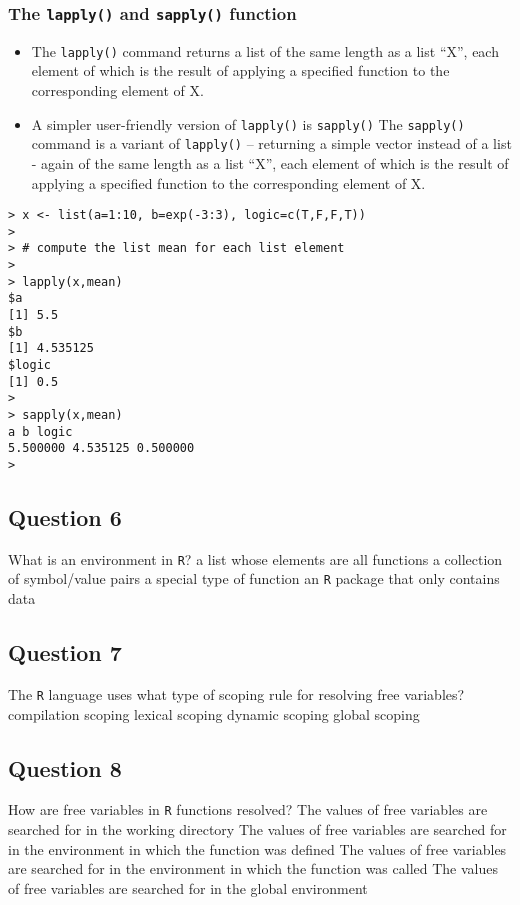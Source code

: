 \documentclass[12pt]{article}
\begin{document}
\subsubsection*{The \texttt{lapply()} and \texttt{sapply()} function}
\begin{itemize}
\item The \texttt{lapply()} command returns a list of the same length as a list “X”, each element of which is the result of applying a specified function to the corresponding element of X.

\item A simpler user-friendly version of \texttt{lapply()} is \texttt{sapply()}
The \texttt{sapply()} command is a variant of \texttt{lapply()} – returning a simple vector instead of a list - again of the same length as a list “X”, each element of which is the result of applying a specified function to the corresponding element of X.
\end{itemize}
\begin{verbatim}
> x <- list(a=1:10, b=exp(-3:3), logic=c(T,F,F,T))
>
> # compute the list mean for each list element
>
> lapply(x,mean)
$a
[1] 5.5
$b
[1] 4.535125
$logic
[1] 0.5
>
> sapply(x,mean)
a b logic
5.500000 4.535125 0.500000
>
\end{verbatim}
\newpage
\subsection*{Question 6}
What is an environment in \texttt{R}?
a list whose elements are all functions
a collection of symbol/value pairs
a special type of function
an \texttt{R} package that only contains data
\newpage
\subsection*{Question 7}
The \texttt{R} language uses what type of scoping rule for resolving free variables?
compilation scoping
lexical scoping
dynamic scoping
global scoping
\newpage
\subsection*{Question 8}
How are free variables in \texttt{R} functions resolved?
The values of free variables are searched for in the working directory
The values of free variables are searched for in the environment in which the function was defined
The values of free variables are searched for in the environment in which the function was called
The values of free variables are searched for in the global environment
\newpage
\end{document}
